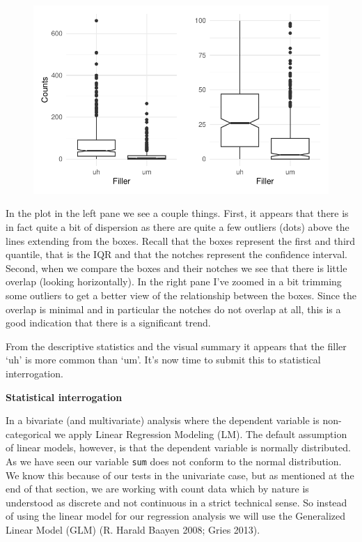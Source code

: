 \documentclass[
  letterpaper,
]{scrbook}
\begin{document}
\begin{figure}[h]

{\centering \includegraphics{./inference_files/figure-pdf/i-bi-cont-visual-1.pdf}

}

\end{figure}

In the plot in the left pane we see a couple things. First, it appears
that there is in fact quite a bit of dispersion as there are quite a few
outliers (dots) above the lines extending from the boxes. Recall that
the boxes represent the first and third quantile, that is the IQR and
that the notches represent the confidence interval. Second, when we
compare the boxes and their notches we see that there is little overlap
(looking horizontally). In the right pane I've zoomed in a bit trimming
some outliers to get a better view of the relationship between the
boxes. Since the overlap is minimal and in particular the notches do not
overlap at all, this is a good indication that there is a significant
trend.

From the descriptive statistics and the visual summary it appears that
the filler `uh' is more common than `um'. It's now time to submit this
to statistical interrogation.

\textbf{Statistical interrogation}

In a bivariate (and multivariate) analysis where the dependent variable
is non-categorical we apply Linear Regression Modeling (LM). The default
assumption of linear models, however, is that the dependent variable is
normally distributed. As we have seen our variable \texttt{sum} does not
conform to the normal distribution. We know this because of our tests in
the univariate case, but as mentioned at the end of that section, we are
working with count data which by nature is understood as discrete and
not continuous in a strict technical sense. So instead of using the
linear model for our regression analysis we will use the Generalized
Linear Model (GLM) (R. Harald Baayen 2008; Gries 2013).
\end{document}
